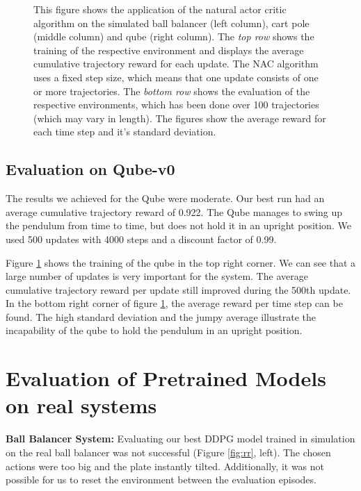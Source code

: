 \begin{figure}
\begin{center}
		\hspace{1.5mm}
		\caption{This figure shows the application of the natural actor critic algorithm on the simulated ball balancer (left column), cart pole (middle column) and qube (right column). The \textit{top row} shows the training of the respective environment and displays the average cumulative trajectory reward for each update. The NAC algorithm uses a fixed step size, which means that one update consists of one or more trajectories. The\textit{ bottom row} shows the evaluation of the respective environments, which has been done over 100 trajectories (which may vary in length). The figures show the average reward for each time step and it's standard deviation.}
		\label{fig:nac}
	\end{center}
\end{figure}

\subsection{Evaluation on Qube-v0}

The results we achieved for the Qube were moderate. Our best run had an average cumulative trajectory reward of 0.922. The Qube manages to swing up the pendulum from time to time, but does not hold it in an upright position. We used 500 updates with 4000 steps and a discount factor of 0.99. 

Figure \ref{fig:nac} shows the training of the qube in the top right corner. We can see that a large number of updates is very important for the system. The average cumulative trajectory reward per update still improved during the 500th update. In the bottom right corner of figure \ref{fig:nac}, the average reward per time step can be found. The high standard deviation and the jumpy average illustrate the incapability of the qube to hold the pendulum in an upright position.



\section{Evaluation of Pretrained Models on real systems}

\textbf{Ball Balancer System:} Evaluating our best DDPG model trained in simulation on the real ball balancer was not successful (Figure \ref{fig:rr}, left). The chosen actions were too big and the plate instantly tilted. Additionally, it was not possible for us to reset the environment between the evaluation episodes.

